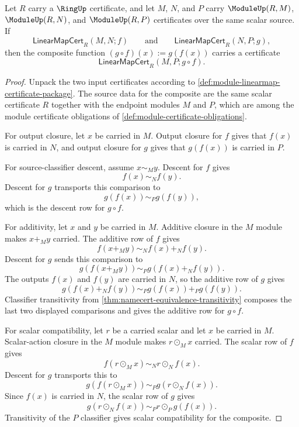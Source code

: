 \begin{theorem}
\label{thm:module-linearmap-composition-certificate}
Let $R$ carry a $\RingUp$ certificate, and let $M$, $N$, and $P$ carry $\ModuleUp(R,M)$, $\ModuleUp(R,N)$, and $\ModuleUp(R,P)$ certificates over the same scalar source. If
$$
\mathsf{LinearMapCert}_R(M,N;f)
\qquad\text{and}\qquad
\mathsf{LinearMapCert}_R(N,P;g),
$$
then the composite function $(g\circ f)(x):=g(f(x))$ carries a certificate
$$
\mathsf{LinearMapCert}_R(M,P;g\circ f).
$$
\end{theorem}
\begin{proof}
Unpack the two input certificates according to \autoref{def:module-linearmap-certificate-package}. The source data for the composite are the same scalar certificate $R$ together with the endpoint modules $M$ and $P$, which are among the module certificate obligations of \autoref{def:module-certificate-obligations}.

For output closure, let $x$ be carried in $M$. Output closure for $f$ gives that $f(x)$ is carried in $N$, and output closure for $g$ gives that $g(f(x))$ is carried in $P$.

For source-classifier descent, assume $x\sim_M y$. Descent for $f$ gives
$$
f(x)\sim_N f(y).
$$
Descent for $g$ transports this comparison to
$$
g(f(x))\sim_P g(f(y)),
$$
which is the descent row for $g\circ f$.

For additivity, let $x$ and $y$ be carried in $M$. Additive closure in the $M$ module makes $x+_M y$ carried. The additive row of $f$ gives
$$
f(x+_M y)\sim_N f(x)+_N f(y).
$$
Descent for $g$ sends this comparison to
$$
g(f(x+_M y))\sim_P g(f(x)+_N f(y)).
$$
The outputs $f(x)$ and $f(y)$ are carried in $N$, so the additive row of $g$ gives
$$
g(f(x)+_N f(y))\sim_P g(f(x))+_P g(f(y)).
$$
Classifier transitivity from \autoref{thm:namecert-equivalence-transitivity} composes the last two displayed comparisons and gives the additive row for $g\circ f$.

For scalar compatibility, let $r$ be a carried scalar and let $x$ be carried in $M$. Scalar-action closure in the $M$ module makes $r\odot_M x$ carried. The scalar row of $f$ gives
$$
f(r\odot_M x)\sim_N r\odot_N f(x).
$$
Descent for $g$ transports this to
$$
g(f(r\odot_M x))\sim_P g(r\odot_N f(x)).
$$
Since $f(x)$ is carried in $N$, the scalar row of $g$ gives
$$
g(r\odot_N f(x))\sim_P r\odot_P g(f(x)).
$$
Transitivity of the $P$ classifier gives scalar compatibility for the composite.


\end{proof}
